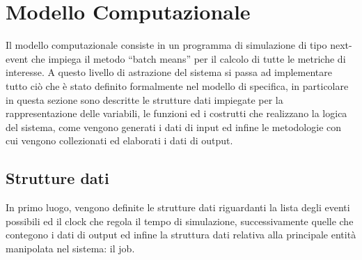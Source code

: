 \section{Modello Computazionale}
Il modello computazionale consiste in un programma di simulazione di tipo
next-event che impiega il metodo ``batch means'' per il calcolo di tutte le
metriche di interesse. 
A questo livello di astrazione del sistema si passa ad implementare tutto ciò
che è stato definito formalmente nel modello di specifica, in particolare in
questa sezione sono descritte le strutture dati impiegate per la
rappresentazione delle variabili, le funzioni ed i costrutti che realizzano la
logica del sistema, come vengono generati i dati di input ed infine le
metodologie con cui vengono collezionati ed elaborati i dati di output.
%
%
\subsection{Strutture dati}
In primo luogo, vengono definite le strutture dati riguardanti la lista degli
eventi possibili ed il clock che regola il tempo di simulazione, successivamente
quelle che contegono i dati di output ed infine la struttura dati relativa alla
principale entità manipolata nel sistema: il job.
%
